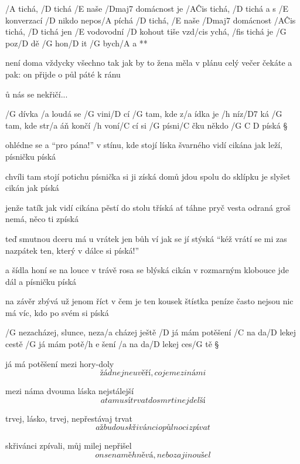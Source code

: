     /A tichá, /D tichá /E naše /Dmaj7 domácnost je /A\^{Cis} tichá, /D tichá
    a s /E konverzací /D nikdo nepos/A píchá
    /D tichá, /E naše /Dmaj7 domácnost /A\^{Cis} tichá, /D tichá
    jen /E vodovodní /D kohout tiše vzd/cis ychá, /fis tichá
    je /G poz/D dě /G hon/D it /G bych/A a **

není doma vždycky všechno tak
jak by to žena měla v plánu
celý večer čekáte a pak:
on přijde o půl páté k ránu

\r u nás se nekřičí...




/G dívka /a loudá se /G vini/D cí
/G tam, kde z/a ídka je /h níz/D7 ká
/G tam, kde str/a áň končí /h voní/C cí
si /G písni/C čku někdo /{G C D} píská \S

ohlédne se a ``pro pána!''
v stínu, kde stojí líska
švarného vidí cikána
jak leží, písničku píská \s

chvíli tam stojí potichu
písnička si ji získá
domů jdou spolu do sklípku
je slyšet cikán jak píská \s

jenže tatík jak vidí cikána
pěstí do stolu tříská
ať táhne pryč vesta odraná
groš nemá, něco ti zpíská \s

teď smutnou dceru má u vrátek
jen bůh ví jak se jí stýská
``kéž vrátí se mi zas nazpátek
ten, který v dálce si píská!''\s

a šídla honí se na louce
v trávě rosa se blýská
cikán v rozmarným klobouce
jde dál a písničku píská \s

na závěr zbývá už jenom říct
v čem je ten kousek štístka
peníze často nejsou nic
má víc, kdo po svém si píská




/G nezacházej, slunce, neza/a cházej ještě
/D já mám potěšení /C na da/D lekej cestě
/G já mám potě/{h e} šení    /a na da/D lekej ces/G tě \S

já má potěšení mezi hory-doly
\[ žádnej neuvěří, co je mezi námi \] \s

mezi náma dvouma láska nejstálejší
\[ a ta musí trvat do smrti nejdelší \] \s

trvej, lásko, trvej, nepřestávaj trvat
\[ až budou skřivánci o půlnoci zpívat \] \s

skřivánci zpívali, můj milej nepřišel
\[ on se na mě hněvá, nebo za jinou šel \]





